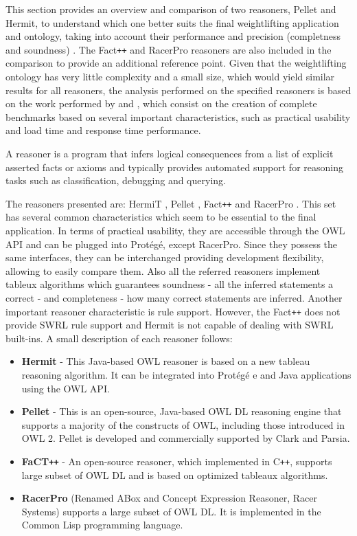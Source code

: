 
This section provides an overview and comparison of two reasoners, Pellet and Hermit, to understand which one better suits the final weightlifting application and ontology, taking into account their performance and precision (completness and soundness) . The Fact\texttt{++} and RacerPro reasoners are also included in the comparison to provide an additional reference point. Given that the weightlifting ontology has very little complexity and a small size, which would yield similar results for all reasoners, the analysis performed on the specified reasoners is based on the work performed by \cite{Dentler2011} and \cite{Bock2008}, which consist on the creation of complete benchmarks based on several important characteristics, such as practical usability and load time and response time performance.

A reasoner is a program that infers logical consequences from a list of explicit asserted facts or axioms and typically provides automated support for reasoning tasks such as classification, debugging and querying.

The reasoners presented are: HermiT \cite{1_hermitreasoner}, Pellet \cite{2_stardog-union/pellet_2016}, Fact\texttt{++} \cite{3_fact++reasoner} and RacerPro \cite{4_racerpro_2016}. This set has several common characteristics which seem to be essential to the final application. In terms of practical usability, they are accessible through the OWL API and can be plugged into Protégé, except RacerPro. Since they possess the same interfaces, they can be interchanged providing development flexibility, allowing to easily compare them. Also all the referred reasoners implement tableux algorithms which guarantees soundness - all the inferred statements a correct - and completeness - how many correct statements are inferred. Another important reasoner characteristic is rule support. However, the Fact\texttt{++} does not provide SWRL rule support and Hermit is not capable of dealing with SWRL built-ins. A small description of each reasoner follows:

\begin{itemize}
\item \textbf{Hermit} - This Java-based OWL reasoner is based on a new tableau reasoning algorithm. It can be integrated into Protégé e and Java applications using the OWL API.
\item \textbf{Pellet} - This is an open-source, Java-based OWL DL reasoning engine that supports a majority of the constructs of OWL, including those introduced in OWL 2. Pellet is developed and commercially supported by Clark and Parsia.
\item \textbf{FaCT\texttt{++}} - An open-source reasoner, which implemented in C\texttt{++}, supports large subset of OWL DL and is based on optimized tableaux algorithms.
\item \textbf{RacerPro} (Renamed ABox and Concept Expression
Reasoner, Racer Systems) supports a large subset of OWL DL. It is implemented in the Common Lisp programming language.
\end{itemize}

